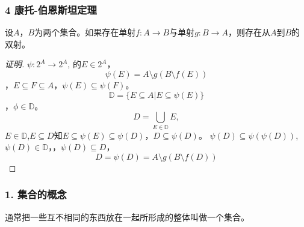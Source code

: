 \documentclass{beamer}
\begin{document}
\begin{CJK*}{UTF8}{gbsn}
\begin{frame}
  \frametitle{4 康托-伯恩斯坦定理}
  \begin{Thm}[康托-伯恩斯坦]
    设$A$，$B$为两个集合。如果存在单射$f:A\to B$与单射$g:B\to A$，则存在从$A$到$B$的双射。
  \end{Thm}\pause
  \begin{proof}[证明]{\small
    $\psi:2^A\to 2^A$,
    的$E\in 2^A$，\pause\[\psi(E)=A\setminus g(B\setminus f(E))\]，$E\subseteq F\subseteq A$，$\psi(E)\subseteq \psi(F)$。
    \[\mathbb{D}=\{E\subseteq A|E\subseteq \psi(E)\}\]，$\phi\in \mathbb{D}$。
    \[D=\bigcup_{E\in \mathbb{D}}E,\]
    $E\in \mathbb{D}$,$E\subseteq D$知$E\subseteq \psi(E) \subseteq \psi(D)$，$D\subseteq \psi(D)$。
    $\psi(D)\subseteq \psi(\psi(D))$,$\psi(D)\in \mathbb{D}$，，\pause$\psi(D)\subseteq D$，
    \pause\[D=\psi(D)=A\setminus g(B\setminus f(D))\]}
  \end{proof}
\end{frame}
\begin{frame}[t]
  \frametitle{1. 集合的概念}
  \begin{Defofset}
    通常把一些互不相同的东西放在一起所形成的整体叫做一个\alert{集合}。
  \end{Defofset}
\end{frame}



    


\end{CJK*}
\end{document}
